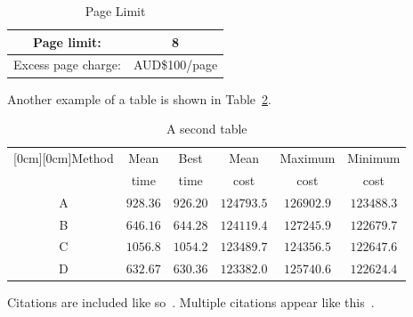 \begin{table}
\begin{center}
\renewcommand{\arraystretch}{1.3}
\caption{Page Limit}
\label{table-tab1}
\begin{tabular}{|c|c|}
\hline
Page limit: & 8\\
\hline
Excess page charge: & AUD\$100/page\\
\hline
\end{tabular}
\end{center}
\end{table}

Another example of a table is shown in Table~\ref{table-tab2}.

\begin{table}[h]
\caption{A second table}
\begin{center}
\begin{tabular}{|c|c|c|c|c|c|}
\hline
\multicolumn{1}{|c|}{\raisebox{-1.50ex}[0cm][0cm]{\!Method\!}}
& \multicolumn{1}{|c|}{Mean}
& \multicolumn{1}{|c|}{Best}
& \multicolumn{1}{|c|}{Mean}
& \multicolumn{1}{|c|}{Maximum}
& \multicolumn{1}{|c|}{Minimum} \\
& time & time & cost & cost & cost\\ \hline
A      &  $928.36$  &  $926.20$  &  $124793.5$ & $126902.9$ & $123488.3$ \\ \hline
B      &  $646.16$  &  $644.28$  &  $124119.4$ & $127245.9$ & $122679.7$ \\ \hline
C      &  $1056.8$  &  $1054.2$  &  $123489.7$ & $124356.5$ & $122647.6$ \\ \hline
D      &  $632.67$  &  $630.36$  &  $123382.0$ & $125740.6$ & $122624.4$ \\ \hline
\end{tabular}
\label{table-tab2}
\end{center}
\end{table}

Citations are included like so~\cite{book}.
Multiple citations appear like this~\cite{conf,article}.
